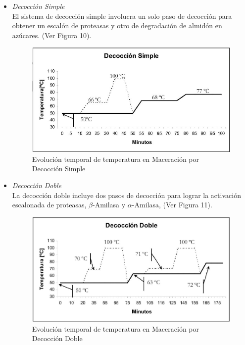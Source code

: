                 \begin{itemize}
                    \item \textit{Decocción Simple} \\ El sistema de decocción simple involucra un solo paso de decocción para obtener un escalón de proteasas y otro de degradación de almidón en azúcares. (Ver Figura 10).
                    
                        \begin{figure} [H]                      \centerline{\includegraphics[scale=0.7]{decoccion_simple.jpg}}
                        \caption{Evolución temporal de temperatura en Maceración por Decocción Simple}
                        \label{MaceracionDecoccionSimple}
                    \end{figure}
                    
                    \item \textit{Decocción Doble} \\ La decocción doble incluye dos pasos de decocción para lograr la activación escalonada de proteasas, $\beta$-Amilasa y $\alpha$-Amilasa, (Ver Figura 11).
                    
                        \begin{figure} [H]		                                                            \centerline{\includegraphics[scale=0.5]{decoccion_doble.jpg}}
                        \caption{Evolución temporal de temperatura en Maceración por Decocción Doble}
                        \label{MaceracionDecoccionDoble}
                        \end{figure}
                    

\end{itemize}
